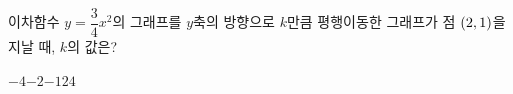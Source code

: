 이차함수 $y=\dfrac{3}{4}x^2$의 그래프를 $y$축의 방향으로 $k$만큼 평행이동한 그래프가 점 $(2{,}\mkern3mu\mathopen{}1)$을 지날 때, $k$의 값은?
\begin{choices32}{$-4$}{$-2$}{$-1$}{$2$}{$4$}\end{choices32}
